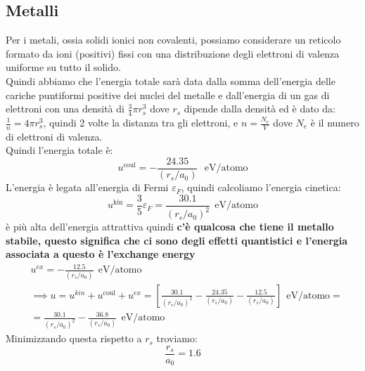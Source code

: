 \subsection{Metalli}
Per i metali, ossia solidi ionici non covalenti, possiamo considerare un reticolo formato da ioni (positivi) fissi con una distribuzione degli elettroni di valenza uniforme su tutto il solido. \\
Quindi abbiamo che l'energia totale sarà data dalla somma dell'energia delle cariche puntiformi positive dei nuclei del metalle e dall'energia di un gas di elettroni con una densità di $\frac{3}{4}\pi r_s^3$ dove $r_s$ dipende dalla densità ed è dato da: $\frac{1}{n} = 4\pi r_s^3$, quindi 2 volte la distanza tra gli elettroni, e $n = \frac{N_e}{V}$ dove $N_e$ è il numero di elettroni di valenza.\\
Quindi l'energia totale è:
\[u^{\text{coul}} = - \frac{24.35}{(r_s/a_0)}  \ \ \ \text{eV/atomo}\]
L'energia è legata all'energia di Fermi $\varepsilon_F$, quindi calcoliamo l'energia cinetica:
\[ u^{\text{kin}} = \frac{3}{5}\varepsilon_F = \frac{30.1}{(r_s/a_0)^2} \ \ \text{eV/atomo}\]
è più alta dell'energia attrattiva quindi \textbf{c'è qualcosa che tiene il metallo stabile, questo significa che ci sono degli effetti quantistici e l'energia associata a questo è l'exchange energy}
\[ \begin{split}
    &u^{ex} = - \frac{12.5}{(r_s/a_0)} \ \ \text{eV/atomo} \\
    &\implies u = u^{kin} +u^{\text{coul}} + u^{ex} = \left[ \frac{30.1}{(r_s/a_0)^2} - \frac{24.35}{(r_s/a_0)} - \frac{12.5}{(r_s/a_0)} \right] \ \ \text{eV/atomo}  =\\
    & = \frac{30.1}{(r_s/a_0)^2} - \frac{36.8}{(r_s/a_0)} \ \ \text{eV/atomo} 
    \end{split}
\]
Minimizzando questa rispetto a $r_s$ troviamo:
\[ \frac{r_s}{a_0} = 1.6\]
